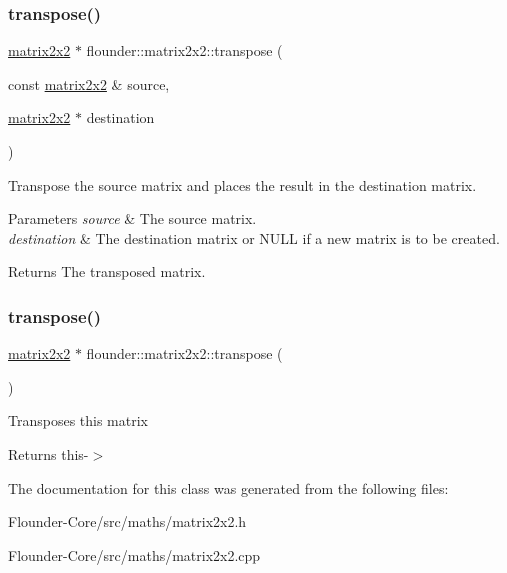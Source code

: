 \subsubsection{\texorpdfstring{transpose()}{transpose()}\hspace{0.1cm}{\footnotesize\ttfamily [1/2]}}
{\footnotesize\ttfamily \hyperlink{classflounder_1_1matrix2x2}{matrix2x2} $\ast$ flounder\+::matrix2x2\+::transpose (\begin{DoxyParamCaption}\item[{const \hyperlink{classflounder_1_1matrix2x2}{matrix2x2} \&}]{source,  }\item[{\hyperlink{classflounder_1_1matrix2x2}{matrix2x2} $\ast$}]{destination }\end{DoxyParamCaption})\hspace{0.3cm}{\ttfamily [static]}}



Transpose the source matrix and places the result in the destination matrix. 


\begin{DoxyParams}{Parameters}
{\em source} & The source matrix. \\
\hline
{\em destination} & The destination matrix or N\+U\+LL if a new matrix is to be created. \\
\hline
\end{DoxyParams}
\begin{DoxyReturn}{Returns}
The transposed matrix. 
\end{DoxyReturn}
\mbox{\label{classflounder_1_1matrix2x2_ab2c07c15e39a1ab13270d88d7d83ee47}} 
\subsubsection{\texorpdfstring{transpose()}{transpose()}\hspace{0.1cm}{\footnotesize\ttfamily [2/2]}}
{\footnotesize\ttfamily \hyperlink{classflounder_1_1matrix2x2}{matrix2x2} $\ast$ flounder\+::matrix2x2\+::transpose (\begin{DoxyParamCaption}{ }\end{DoxyParamCaption})}



Transposes this matrix 

\begin{DoxyReturn}{Returns}
this-\/$>$ 
\end{DoxyReturn}


The documentation for this class was generated from the following files\+:\begin{DoxyCompactItemize}
\item 
Flounder-\/\+Core/src/maths/matrix2x2.\+h\item 
Flounder-\/\+Core/src/maths/matrix2x2.\+cpp\end{DoxyCompactItemize}
